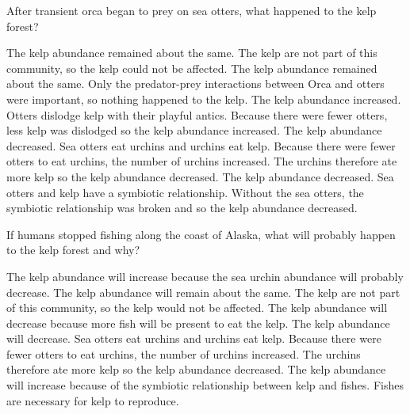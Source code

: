 
\question

\begin{choices}
\correctchoice  %
\choice  %
\choice  %
\choice  %
\choice  %
\end{choices}



\question
After transient orca began to prey on sea otters, what happened to the kelp forest?

\begin{choices}
	\choice The kelp abundance remained about the same. The kelp are not part of this community, so the kelp could not be affected.%
	\choice The kelp abundance remained about the same. Only the predator-prey interactions between Orca and otters were important, so nothing happened to the kelp.%
	\choice The kelp abundance increased. Otters dislodge kelp with their playful antics.  Because there were fewer otters, less kelp was dislodged so the kelp abundance increased.%
	\correctchoice The kelp abundance decreased. Sea otters eat urchins and urchins eat kelp.  Because there were fewer otters to eat urchins, the number of urchins increased.  The urchins therefore ate more kelp so the kelp abundance decreased.%
	\choice The kelp abundance decreased. Sea otters and kelp have a symbiotic relationship. Without the sea otters, the symbiotic relationship was broken and so the kelp abundance decreased.%
\end{choices}

\question
If humans stopped fishing along the coast of Alaska, what will probably happen to the kelp forest and why?

\begin{choices}
	\correctchoice The kelp abundance will increase because the sea urchin abundance will probably decrease.%
	\choice The kelp abundance will remain about the same. The kelp are not part of this community, so the kelp would not be affected.%
	\choice The kelp abundance will decrease because more fish will be present to eat the kelp.%
	\choice The kelp abundance will decrease. Sea otters eat urchins and urchins eat kelp. Because there were fewer otters to eat urchins, the number of urchins increased. The urchins therefore ate more kelp so the kelp abundance decreased.%
	\choice The kelp abundance will increase because of the symbiotic relationship between kelp and fishes. Fishes are necessary for kelp to reproduce.%
\end{choices}

